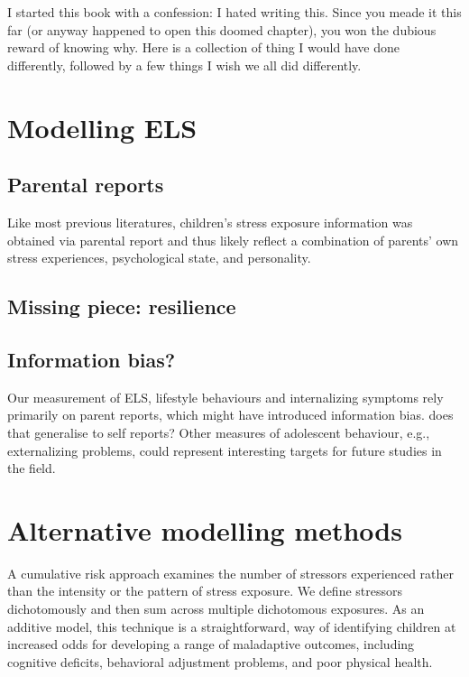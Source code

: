 \documentclass[
  letterpaper,
  DIV=11,
  numbers=noendperiod]{scrreport}
\begin{document}
I started this book with a confession: I hated writing this. Since you
meade it this far (or anyway happened to open this doomed chapter), you
won the dubious reward of knowing why. Here is a collection of thing I
would have done differently, followed by a few things I wish we all did
differently.

\section{Modelling ELS}\label{modelling-els}

\subsection{Parental reports}\label{parental-reports}

Like most previous literatures, children's stress exposure information
was obtained via parental report and thus likely reflect a combination
of parents' own stress experiences, psychological state, and
personality.

\subsection{Missing piece: resilience}\label{missing-piece-resilience}

\subsection{Information bias?}\label{information-bias}

Our measurement of ELS, lifestyle behaviours and internalizing symptoms
rely primarily on parent reports, which might have introduced
information bias. does that generalise to self reports? Other measures
of adolescent behaviour, e.g., externalizing problems, could represent
interesting targets for future studies in the field.

\section{Alternative modelling
methods}\label{alternative-modelling-methods}

A cumulative risk approach examines the number of stressors experienced
rather than the intensity or the pattern of stress exposure. We define
stressors dichotomously and then sum across multiple dichotomous
exposures. As an additive model, this technique is a straightforward,
way of identifying children at increased odds for developing a range of
maladaptive outcomes, including cognitive deficits, behavioral
adjustment problems, and poor physical health.
\end{document}
